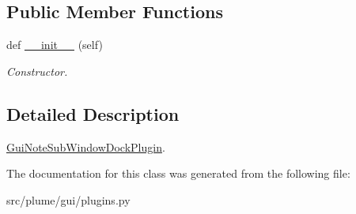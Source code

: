 \subsection*{Public Member Functions}
\begin{DoxyCompactItemize}
\item 
def \hyperlink{classplume-creator_1_1src_1_1plume_1_1gui_1_1plugins_1_1_gui_note_sub_window_dock_plugin_a21dfab661f38c087a27c7da0bf43bc9c}{\+\_\+\+\_\+init\+\_\+\+\_\+} (self)\hypertarget{classplume-creator_1_1src_1_1plume_1_1gui_1_1plugins_1_1_gui_note_sub_window_dock_plugin_a21dfab661f38c087a27c7da0bf43bc9c}{}\label{classplume-creator_1_1src_1_1plume_1_1gui_1_1plugins_1_1_gui_note_sub_window_dock_plugin_a21dfab661f38c087a27c7da0bf43bc9c}

\begin{DoxyCompactList}\small\item\em Constructor. \end{DoxyCompactList}\end{DoxyCompactItemize}


\subsection{Detailed Description}
\hyperlink{classplume-creator_1_1src_1_1plume_1_1gui_1_1plugins_1_1_gui_note_sub_window_dock_plugin}{Gui\+Note\+Sub\+Window\+Dock\+Plugin}. 

The documentation for this class was generated from the following file\+:\begin{DoxyCompactItemize}
\item 
src/plume/gui/plugins.\+py\end{DoxyCompactItemize}
